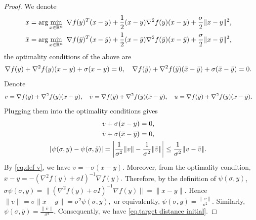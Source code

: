 \documentclass{article}
\numberwithin{equation}{section}
\numberwithin{equation}{section}
\begin{document}
\begin{proof}
    We denote
    \begin{gather*}
        x = \arg\min_{x\in \mathbb{R}^n} \ \nabla f(y)^T(x-y) +\frac{1}{2}(x-y)\nabla ^2 f(y)(x-y) +\frac{\sigma}{2}\|x-y\|^2,\\
        \Bar{x} = \arg\min_{x\in \mathbb{R}^n} \ \nabla f(\Bar{y})^T(x-\Bar{y}) +\frac{1}{2}(x-\Bar{y})\nabla ^2 f(\Bar{y})(x-\Bar{y}) +\frac{\sigma}{2}\|x-\Bar{y}\|^2,
    \end{gather*}
    the optimality conditions of the above are
    \begin{equation*}
        \nabla f(y) + \nabla ^2 f(y)(x-y) +\sigma(x-y)=0,\quad
        \nabla f(\Bar{y})+\nabla ^2 f(\Bar{y})(\Bar{x}-\Bar{y})+\sigma(\Bar{x}-\Bar{y})=0.
    \end{equation*}
    Denote
    \begin{equation*}
        v = \nabla f(y) + \nabla ^2 f(y)(x-y),\quad
        \Bar{v} =  \nabla f(\Bar{y})+\nabla ^2 f(\Bar{y})(\Bar{x}-\Bar{y}),\quad
        u = \nabla f(\Bar{y})+\nabla ^2 f(\Bar{y})(x-\Bar{y}).
    \end{equation*}
    Plugging them into the optimality conditions gives
    \begin{gather}
        \label{eq.def v}
        v+\sigma(x-y)=0,\\
        \label{eq.def bar v}
        \Bar{v}+\sigma(\Bar{x}-\Bar{y})=0,\\
        \label{eq.target distance initial}
        \left \vert \psi(\sigma,y)-\psi(\sigma,\Bar{y}) \right\vert= \left \vert\frac{1}{\sigma^2}\|v\| -\frac{1}{\sigma^2}\|\Bar{v}\|\right\vert\leq \frac{1}{\sigma^2}\|v-\Bar{v}\|.
    \end{gather}
    By \eqref{eq.def v}, we have
    \(
    v=-\sigma(x-y).
    \)
    Moreover, from the optimality condition,
    \(
    x-y=-(\nabla^2 f(y)+\sigma I)^{-1}\nabla f(y).
    \)
    Therefore, by the definition of \(\psi(\sigma,y)\),
    \(
    \sigma\psi(\sigma,y)
    =
    \|(\nabla^2 f(y)+\sigma I)^{-1}\nabla f(y)\|
    =
    \|x-y\|.
    \)
    Hence
    \(
    \|v\|
    =
    \sigma\|x-y\|
    =
    \sigma^2\psi(\sigma,y),
    \)
    or equivalently,
    \(
    \psi(\sigma,y)=\frac{\|v\|}{\sigma^2}.
    \)
    Similarly, \(\psi(\sigma,\bar y)=\frac{\|\bar v\|}{\sigma^2}. \)
    Consequently, we have \eqref{eq.target distance initial}.


\end{proof}
\end{document}
